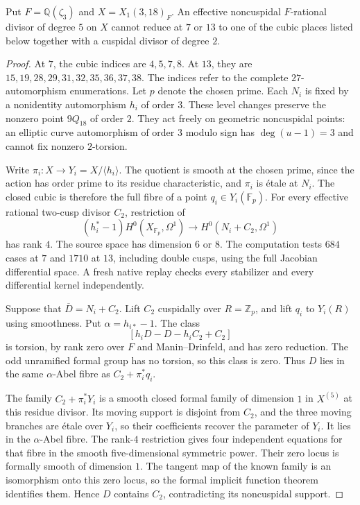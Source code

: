 \begin{lemma}\label{lem:decic-318-cubic-fibre}
Put $F=\mathbb Q(\zeta_3)$ and $X=X_1(3,18)_F$.
An effective noncuspidal $F$-rational divisor of degree $5$ on $X$
cannot reduce at $7$ or $13$ to one of the cubic places listed
below together with a cuspidal divisor of degree $2$.
\end{lemma}
\begin{proof}
At $7$, the cubic indices are $4,5,7,8$. At $13$, they are
$15,19,28,29,31,32,35,36,37,38$. The indices refer to the
complete $27$-automorphism enumerations. Let $p$ denote the chosen prime.
Each $N_i$ is fixed by a nonidentity automorphism $h_i$ of order $3$.
These level changes preserve the nonzero point $9Q_{18}$ of order $2$.
They act freely on geometric noncuspidal points: an elliptic
curve automorphism of order $3$ modulo sign has $\deg(u-1)=3$
and cannot fix nonzero $2$-torsion.

Write $\pi_i:X\to Y_i=X/\langle h_i\rangle$.
The quotient is smooth at the chosen prime, since the action
has order prime to its residue characteristic, and $\pi_i$ is \'etale at $N_i$.
The closed cubic is therefore the full fibre of a point
$q_i\in Y_i(\mathbb F_p)$.
For every effective rational two-cusp divisor $C_2$,
restriction of
\[
 (h_i^*-1)H^0(X_{\mathbb F_p},\Omega^1)
                 \longrightarrow H^0(N_i+C_2,\Omega^1)
\]
has rank $4$. The source space has dimension $6$ or $8$.
The computation tests $684$ cases at $7$ and $1710$ at $13$,
including double cusps, using the full Jacobian differential space.
A fresh native replay checks every stabilizer and every differential
kernel independently.

Suppose that $\overline D=N_i+C_2$.
Lift $C_2$ cuspidally over $R=\mathbb Z_p$, and lift $q_i$ to
$Y_i(R)$ using smoothness. Put $\alpha=h_{i*}-1$.
The class
\[
 [h_iD-D-h_iC_2+C_2]
\]
is torsion, by rank zero over $F$ and Manin--Drinfeld, and has
zero reduction. The odd unramified formal group has no torsion,
so this class is zero.
Thus $D$ lies in the same $\alpha$-Abel fibre as
$C_2+\pi_i^*q_i$.

The family $C_2+\pi_i^*Y_i$ is a smooth closed formal family of
dimension $1$ in $X^{(5)}$ at this residue divisor.
Its moving support is disjoint from $C_2$, and the three moving
branches are \'etale over $Y_i$, so their coefficients recover
the parameter of $Y_i$. It lies in the $\alpha$-Abel fibre.
The rank-$4$ restriction gives four independent equations for
that fibre in the smooth five-dimensional symmetric power.
Their zero locus is formally smooth of dimension $1$.
The tangent map of the known family is an isomorphism onto this
zero locus, so the formal implicit function theorem identifies
them. Hence $D$ contains $C_2$, contradicting its noncuspidal support.
\end{proof}
